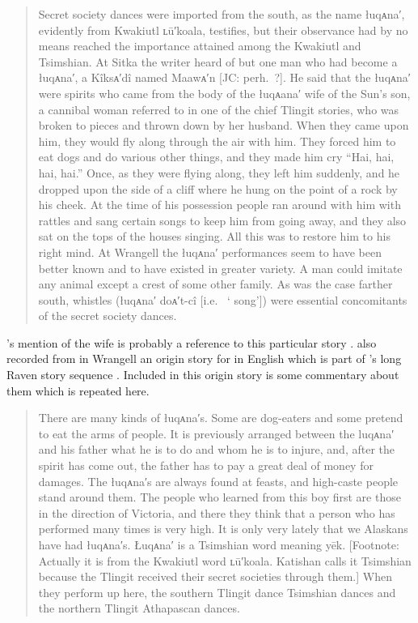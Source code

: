 \begin{quote}\small
Secret society dances were imported from the south, as the name łuqᴀna′, evidently from Kwakiutl ʟū′koala, testifies, but their observance had by no means reached the importance attained among the Kwakiutl and Tsimshian.
At Sitka the writer heard of but one man who had become a łuqᴀna′, a Kîksᴀ′dî named Maawᴀ′n [JC: perh.\ ?].
He said that the łuqᴀna′ were spirits who came from the body of the łuqᴀana′ wife of the Sun’s son, a cannibal woman referred to in one of the chief Tlingit stories, who was broken to pieces and thrown down by her husband.
When they came upon him, they would fly along through the air with him.
They forced him to eat dogs and do various other things, and they made him cry “Hai, hai, hai, hai.” Once, as they were flying along, they left him suddenly, and he dropped upon the side of a cliff where he hung on the point of a rock by his cheek.
At the time of his possession people ran around with him with rattles and sang certain songs to keep him from going away, and they also sat on the tops of the houses singing.
All this was to restore him to his right mind.
At Wrangell the łuqᴀna′ performances seem to have been better known and to have existed in greater variety.
A man could imitate any animal except a crest of some other family.
As was the case farther south, whistles (łuqᴀna′ doᴀ′t-cî [i.e.\  ‘ song’]) were essential concomitants of the secret society dances.
\end{quote}

\citeauthor{swanton:1909}’s mention of the  wife is probably a reference to this particular story . 
\citeauthor{swanton:1909} also recorded from  in Wrangell an origin story for  in English which is part of ’s long Raven story sequence \parencite[133–135]{swanton:1909}.
Included in this  origin story is some commentary about them which is repeated here.

\begin{quote}\small
There are many kinds of łuqᴀna′s.
Some are dog-eaters and some pretend to eat the arms of people.
It is previously arranged between the luqᴀna′ and his father what he is to do and whom he is to injure, and, after the spirit has come out, the father has to pay a great deal of money for damages.
The łuqᴀna′s are always found at feasts, and high-caste people stand around them.
The people who learned from this boy first are those in the direction of Victoria, and there they think that a person who has performed many times is very high.
It is only very lately that we Alaskans have had łuqᴀna′s.
Łuqᴀna′ is a Tsimshian word meaning yēk. [Footnote: Actually it is from the Kwakiutl word ʟū′koala.
Katishan calls it Tsimshian because the Tlingit received their secret societies through them.] When they perform up here, the southern Tlingit dance Tsimshian dances and the northern Tlingit Athapascan dances.
\end{quote}

